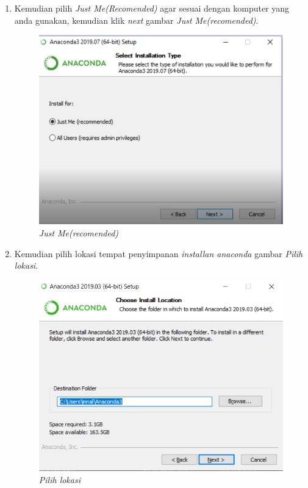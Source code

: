 \begin{enumerate}
\item Kemudian pilih \textit{Just Me(Recomended)} agar sesuai dengan komputer yang anda gunakan, kemudian klik \textit{next}
 gambar \textit{Just Me(recomended)}.

\begin{figure}[H]
    \centering
    \includegraphics[scale=0.5]{figures/5}
    \caption{\textit{Just Me(recomended)}}
    \label{Figureanaconda4}
\end{figure}


\item Kemudian pilih lokasi tempat penyimpanan  \textit{installan anaconda}
 gambar \textit{Pilih lokasi}.

\begin{figure}[H]
    \centering
    \includegraphics[scale=0.5]{figures/6}
    \caption{\textit{Pilih lokasi}}
    \label{Figureanaconda5}
\end{figure}


\end{enumerate}
